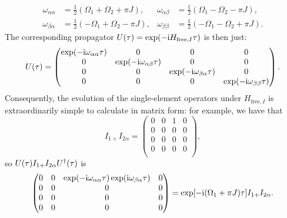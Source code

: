 \begin{equation}
    \label{eq:state_precessions}
    \begin{aligned}
        \omega_{\alpha\alpha} &= \frac{1}{2}(\Omega_1 + \Omega_2 + \pi J), &
        \omega_{\alpha\beta} &= \frac{1}{2}(\Omega_1 - \Omega_2 - \pi J), \\
        \omega_{\beta\alpha} &= \frac{1}{2}(-\Omega_1 + \Omega_2 - \pi J), &
        \omega_{\beta\beta} &= \frac{1}{2}(-\Omega_1 - \Omega_2 + \pi J).
    \end{aligned}
\end{equation}
The corresponding propagator $U(\tau) = \exp(-\mathrm{i} H_{\text{free},I}\tau)$ is then just:
\begin{equation}
    \label{eq:u_free_weak}
    U(\tau) = \begin{pmatrix}
        \exp(-\mathrm{i}\omega_{\alpha\alpha}\tau) & 0 & 0 & 0 \\
        0 & \exp(-\mathrm{i}\omega_{\alpha\beta}\tau) & 0 & 0 \\
        0 & 0 & \exp(-\mathrm{i}\omega_{\beta\alpha}\tau) & 0 \\
        0 & 0 & 0 & \exp(-\mathrm{i}\omega_{\beta\beta}\tau) \\
    \end{pmatrix}.
\end{equation}
Consequently, the evolution of the single-element operators under $H_{\text{free},I}$ is extraordinarily simple to calculate in matrix form: for example, we have that
\begin{equation}
    \label{eq:single_elem_plusalpha_evolution}
    I_{1+}I_{2\alpha} = \begin{pmatrix}
        0 & 0 & 1 & 0 \\
        0 & 0 & 0 & 0 \\
        0 & 0 & 0 & 0 \\
        0 & 0 & 0 & 0 \\
    \end{pmatrix},
\end{equation}
so $U(\tau) I_{1+} I_{2\alpha} U^\dagger(\tau)$ is
\begin{equation}
    \label{eq:single_elem_plusalpha_evolution_2}
    \begin{pmatrix}
        0 & 0 & \exp(-\mathrm{i}\omega_{\alpha\alpha}\tau)\exp(\mathrm{i}\omega_{\beta\alpha}\tau) & 0 \\
        0 & 0 & 0 & 0 \\
        0 & 0 & 0 & 0 \\
        0 & 0 & 0 & 0 \\
    \end{pmatrix} = \exp[-\mathrm{i}(\Omega_1 + \pi J)\tau] I_{1+}I_{2\alpha}.
\end{equation}
